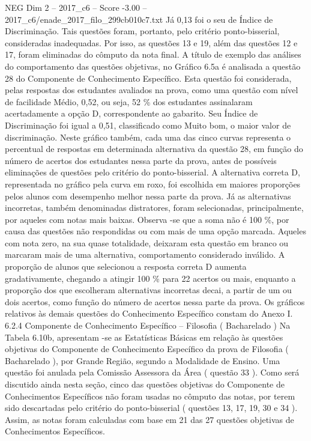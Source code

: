 \begin{textsample}{NEG Dim 2 – 2017\_c6 – Score -3.00 – 2017\_c6/enade\_2017\_filo\_299cb010c7.txt}
Já 0,13 foi o seu de Índice de Discriminação.
Tais questões foram, portanto, pelo critério ponto-bisserial, consideradas inadequadas.
Por isso, as questões 13 e 19, além das questões 12 e 17, foram eliminadas do cômputo da nota final.
A título de exemplo das análises do comportamento das questões objetivas, no Gráfico 6.5a é analisada a questão 28 do Componente de Conhecimento Específico.
Esta questão foi considerada, pelas respostas dos estudantes avaliados na prova, como uma questão com nível de facilidade Médio, 0,52, ou seja, 52 \% dos estudantes assinalaram acertadamente a opção D, correspondente ao gabarito.
Seu Índice de Discriminação foi igual a 0,51, classificado como Muito bom, o maior valor de discriminação.
Neste gráfico também, cada uma das cinco curvas representa o percentual de respostas em determinada alternativa da questão 28, em função do número de acertos dos estudantes nessa parte da prova, antes de possíveis eliminações de questões pelo critério do ponto-bisserial.
A alternativa correta D, representada no gráfico pela curva em roxo, foi escolhida em maiores proporções pelos alunos com desempenho melhor nessa parte da prova.
Já as alternativas incorretas, também denominadas distratores, foram selecionadas, principalmente, por aqueles com notas mais baixas.
Observa -se que a soma não é 100 \%, por causa das questões não respondidas ou com mais de uma opção marcada.
Aqueles com nota zero, na sua quase totalidade, deixaram esta questão em branco ou marcaram mais de uma alternativa, comportamento considerado inválido.
A proporção de alunos que selecionou a resposta correta D aumenta gradativamente, chegando a atingir 100 \% para 22 acertos ou mais, enquanto a proporção dos que escolheram alternativas incorretas decai, a partir de um ou dois acertos, como função do número de acertos nessa parte da prova.
Os gráficos relativos às demais questões do Conhecimento Específico constam do Anexo I. 6.2.4 Componente de Conhecimento Específico – Filosofia ( Bacharelado ) Na Tabela 6.10b, apresentam -se as Estatísticas Básicas em relação às questões objetivas do Componente de Conhecimento Específico da prova de Filosofia ( Bacharelado ), por Grande Região, segundo a Modalidade de Ensino.
Uma questão foi anulada pela Comissão Assessora da Área ( questão 33 ).
Como será discutido ainda nesta seção, cinco das questões objetivas do Componente de Conhecimentos Específicos não foram usadas no cômputo das notas, por terem sido descartadas pelo critério do ponto-bisserial ( questões 13, 17, 19, 30 e 34 ).
Assim, as notas foram calculadas com base em 21 das 27 questões objetivas de Conhecimentos Específicos.

\end{textsample}
